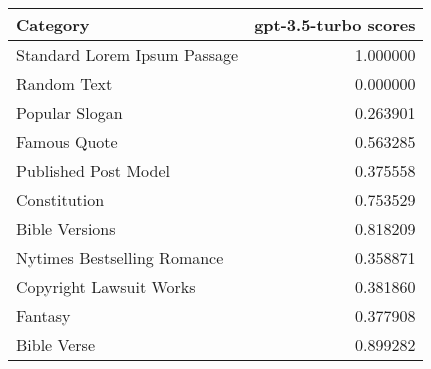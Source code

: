\begin{tabular}{lr}
\toprule
Category & gpt-3.5-turbo scores \\
\midrule
Standard Lorem Ipsum Passage & 1.000000 \\
Random Text & 0.000000 \\
Popular Slogan & 0.263901 \\
Famous Quote & 0.563285 \\
Published Post Model & 0.375558 \\
Constitution & 0.753529 \\
Bible Versions & 0.818209 \\
Nytimes Bestselling Romance & 0.358871 \\
Copyright Lawsuit Works & 0.381860 \\
Fantasy & 0.377908 \\
Bible Verse & 0.899282 \\
\bottomrule
\end{tabular}
